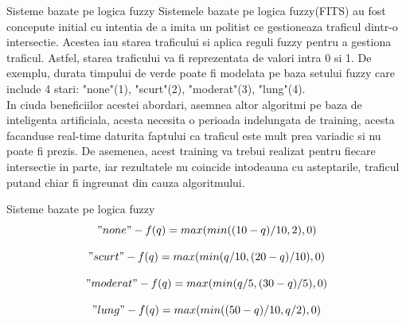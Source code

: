 \documentclass{beamer}
\begin{document}
    \begin{frame}{Sisteme bazate pe logica fuzzy}
        Sistemele bazate pe logica fuzzy(FITS) au fost concepute initial 
        cu intentia de a imita un politist ce gestioneaza traficul dintr-o 
        intersectie. Acestea iau starea traficului si aplica reguli fuzzy 
        pentru a gestiona traficul. Astfel, starea traficului va fi 
        reprezentata de valori intra 0 si 1. De exemplu, durata timpului de 
        verde poate fi modelata pe baza setului fuzzy care include 4 stari:
        "none"(1), "scurt"(2), "moderat"(3), "lung"(4). \\
        In ciuda beneficiilor acestei abordari, asemnea altor algoritmi pe baza 
        de inteligenta artificiala, acesta necesita o perioada indelungata de 
        training, acesta facanduse real-time daturita faptului ca traficul este 
        mult prea variadic si nu poate fi prezis. De asemenea, acest 
        training va trebui realizat pentru fiecare intersectie in parte, iar 
        rezultatele nu coincide intodeauna cu asteptarile, traficul putand 
        chiar fi ingreunat din cauza algoritmului.
    \end{frame}

    \begin{frame}{Sisteme bazate pe logica fuzzy}
        \begin{equation}
            "none" - f(q) = max(min((10 - q) / 10, 2), 0)
        \end{equation}
        
        \begin{equation}
            "scurt" - f(q) = max(min(q / 10, (20 - q) / 10), 0)
        \end{equation}
        
        \begin{equation}
            "moderat" - f(q) = max(min(q / 5, (30 - q) / 5), 0)
        \end{equation}
        
        \begin{equation}
            "lung" - f(q) = max(min((50 - q) / 10, q / 2), 0)
        \end{equation}
    \end{frame}
\end{document}
